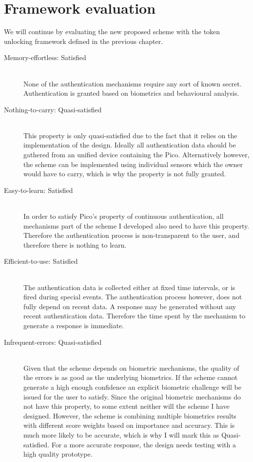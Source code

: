 \section{Framework evaluation}
We will continue by evaluating the new proposed scheme with the token unlocking framework defined in the previous chapter. 

\begin{description}
  \item[Memory-effortless: Satisfied] \hfill \\
  None of the authentication mechanisms require any sort of known secret. Authentication is granted based on biometrics and behavioural analysis.
  
  \item[Nothing-to-carry: Quasi-satisfied] \hfill \\
  This property is only quasi-satisfied due to the fact that it relies on the implementation of the design. Ideally all authentication data should be gathered from an unified device containing the Pico. Alternatively however, the scheme can be implemented using individual sensors which the owner would have to carry, which is why the property is not fully granted.
  
  \item[Easy-to-learn: Satisfied] \hfill \\
  In order to satisfy Pico's property of continuous authentication, all mechanisms part of the scheme I developed also need to have this property. Therefore the authentication process is non-transparent to the user, and therefore there is nothing to learn.
  
  \item[Efficient-to-use: Satisfied] \hfill \\
  The authentication data is collected either at fixed time intervals, or is fired during special events. The authentication process however, does not fully depend on recent data. A response may be generated without any recent authentication data. Therefore the time spent by the mechanism to generate a response is immediate.
  
  \item[Infrequent-errors: Quasi-satisfied] \hfill \\
  Given that the scheme depends on biometric mechanisms, the quality of the errors is as good as the underlying biometrics. If the scheme cannot generate a high enough confidence an explicit biometric challenge will be issued for the user to satisfy. Since the original biometric mechanisms do not have this property, to some extent neither will the scheme I have designed. However, the scheme is combining multiple biometrics results with different score weights based on importance and accuracy. This is much more likely to be accurate, which is why I will mark this as Quasi-satisfied. For a more accurate response, the design needs testing with a high quality prototype. 
  

\end{description}
